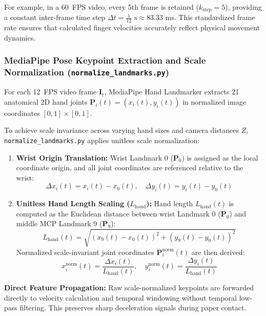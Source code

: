 For example, in a 60~FPS video, every 5th frame is retained ($k_{\text{step}} = 5$), providing a constant inter-frame time step $\Delta t = \frac{1}{12}\text{ s} \approx 83.33\text{ ms}$. This standardized frame rate ensures that calculated finger velocities accurately reflect physical movement dynamics.

\subsubsection{MediaPipe Pose Keypoint Extraction and Scale Normalization (\texttt{normalize\_landmarks.py})}
For each 12~FPS video frame $\mathbf{I}_t$, MediaPipe Hand Landmarker extracts 21 anatomical 2D hand joints $\mathbf{P}_i(t) = (x_i(t), y_i(t))$ in normalized image coordinates $[0, 1] \times [0, 1]$.

To achieve scale invariance across varying hand sizes and camera distances $Z$, \texttt{normalize\_landmarks.py} applies unitless scale normalization:
\begin{enumerate}
    \item \textbf{Wrist Origin Translation:} Wrist Landmark 0 ($\mathbf{P}_0$) is assigned as the local coordinate origin, and all joint coordinates are referenced relative to the wrist:
    \begin{equation}
    \Delta x_i(t) = x_i(t) - x_0(t), \quad \Delta y_i(t) = y_i(t) - y_0(t)
    \label{eq:wrist_translation}
    \end{equation}
    \item \textbf{Unitless Hand Length Scaling ($L_{\text{hand}}$):} Hand length $L_{\text{hand}}(t)$ is computed as the Euclidean distance between wrist Landmark 0 ($\mathbf{P}_0$) and middle MCP Landmark 9 ($\mathbf{P}_9$):
    \begin{equation}
    L_{\text{hand}}(t) = \sqrt{(x_9(t) - x_0(t))^2 + (y_9(t) - y_0(t))^2}
    \label{eq:hand_length_derivation}
    \end{equation}
    Normalized scale-invariant joint coordinates $\mathbf{P}_i^{\text{norm}}(t)$ are then derived:
    \begin{equation}
    x_i^{\text{norm}}(t) = \frac{\Delta x_i(t)}{L_{\text{hand}}(t)}, \quad y_i^{\text{norm}}(t) = \frac{\Delta y_i(t)}{L_{\text{hand}}(t)}
    \label{eq:scale_norm_coords}
    \end{equation}
\end{enumerate}

\textbf{Direct Feature Propagation:} Raw scale-normalized keypoints are forwarded directly to velocity calculation and temporal windowing without temporal low-pass filtering. This preserves sharp deceleration signals during paper contact.

